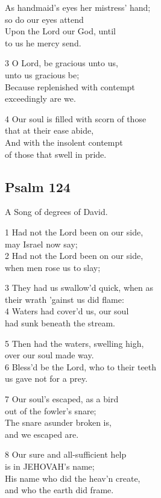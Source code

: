 \begin{multicols}{3}
As handmaid’s eyes her mistress’ hand;\\
so do our eyes attend\\
Upon the Lord our God, until\\
to us he mercy send.

3 O Lord, be gracious unto us,\\
unto us gracious be;\\
Because replenished with contempt\\
exceedingly are we.

4 Our soul is filled with scorn of those\\
that at their ease abide,\\
And with the insolent contempt\\
of those that swell in pride.

\begin{center}
\quad{}\quad{}
\end{center}

\subsection*{Psalm 124}

A Song of degrees of David.

1 Had not the Lord been on our side,\\
may Israel now say;\\
2 Had not the Lord been on our side,\\
when men rose us to slay;

3 They had us swallow’d quick, when as\\
their wrath ’gainst us did flame:\\
4 Waters had cover’d us, our soul\\
had sunk beneath the stream.

5 Then had the waters, swelling high,\\
over our soul made way.\\
6 Bless’d be the Lord, who to their teeth\\
us gave not for a prey.

7 Our soul’s escaped, as a bird\\
out of the fowler’s snare;\\
The snare asunder broken is,\\
and we escaped are.

8 Our sure and all-sufficient help\\
is in JEHOVAH’s name;\\
His name who did the heav’n create,\\
and who the earth did frame.


\end{multicols}
